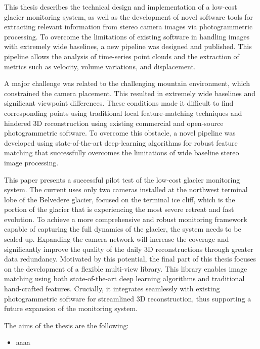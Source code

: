 This thesis describes the technical design and implementation of a low-cost glacier monitoring system, as well as the development of novel software tools for extracting relevant information from stereo camera images via photogrammetric processing. 
To overcome the limitations of existing software in handling images with extremely wide baselines, a new pipeline was designed and published. 
This pipeline allows the analysis of time-series point clouds and the extraction of metrics such as velocity, 
volume variations, and displacement.

A major challenge was related to the challenging mountain environment, which constrained the camera placement.
This resulted in extremely wide baselines and significant viewpoint differences.  
These conditions made it difficult to find corresponding points using traditional local feature-matching techniques 
and hindered 3D reconstruction using existing commercial and open-source photogrammetric software.
To overcome this obstacle, a novel pipeline was developed using state-of-the-art deep-learning algorithms 
for robust feature matching that successfully overcomes the limitations of wide baseline stereo image processing.

This paper presents a successful pilot test of the low-cost glacier monitoring system.
The current uses only two cameras installed at the northwest terminal lobe of the Belvedere glacier, focused 
on the terminal ice cliff, which is the portion of the glacier that is experiencing the most severe retreat 
and fast evolution. 
To achieve a more comprehensive and robust monitoring framework capable of capturing the full dynamics of the glacier, 
the system needs to be scaled up. 
Expanding the camera network will increase the coverage and significantly improve the quality of the daily 3D 
reconstructions through greater data redundancy.
Motivated by this potential, the final part of this thesis focuses on the development of a flexible multi-view library. 
This library enables image matching using both state-of-the-art deep learning algorithms and traditional hand-crafted features. 
Crucially, it integrates seamlessly with existing photogrammetric software for streamlined 3D reconstruction, 
thus supporting a future expansion of the monitoring system.

{\color{red}
The aims of the thesis are the following:
\begin{itemize}
    \item aaaa
\end{itemize}
}

